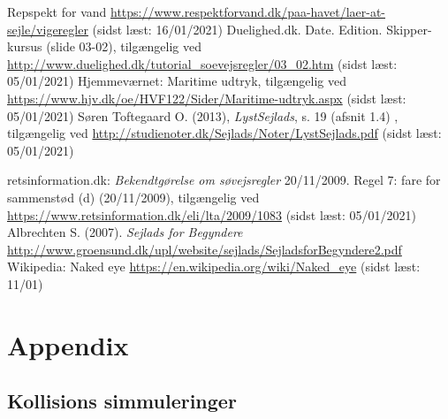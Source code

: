 \documentclass[%
 reprint,
nofootinbib,
aps,
]{revtex4-1}
\begin{document}
\begin{thebibliography}{9}
   Repspekt for vand \url{https://www.respektforvand.dk/paa-havet/laer-at-sejle/vigeregler} (sidst læst: 16/01/2021)
   Duelighed.dk. Date. Edition. Skipper-kursus (slide 03-02), tilgængelig ved \url{http://www.duelighed.dk/tutorial_soevejsregler/03_02.htm} (sidst læst: 05/01/2021)
   Hjemmeværnet: Maritime udtryk, tilgængelig ved \url{https://www.hjv.dk/oe/HVF122/Sider/Maritime-udtryk.aspx} (sidst læst: 05/01/2021)
   Søren Toftegaard O. (2013), \textit{LystSejlads}, s. 19 (afsnit 1.4) , tilgængelig ved \url{http://studienoter.dk/Sejlads/Noter/LystSejlads.pdf} (sidst læst: 05/01/2021)

  \pagebreak
   retsinformation.dk: \textit{Bekendtgørelse om søvejsregler} 20/11/2009. Regel 7: fare for sammenstød (d) (20/11/2009), tilgængelig ved \url{https://www.retsinformation.dk/eli/lta/2009/1083} (sidst læst: 05/01/2021)
   Albrechten S. (2007). \textit{Sejlads for Begyndere} \url{http://www.groensund.dk/upl/website/sejlads/SejladsforBegyndere2.pdf}
   Wikipedia: Naked eye \url{https://en.wikipedia.org/wiki/Naked_eye} (sidst læst: 11/01)
\end{thebibliography}

\clearpage
\onecolumngrid
\section*{Appendix}

\subsection{Kollisions simmuleringer}
\end{document}
